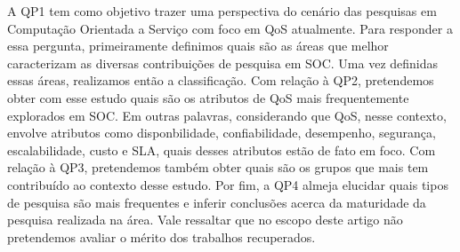 A QP1 tem como objetivo trazer uma perspectiva do cen\'{a}rio das pesquisas em Computa\c{c}\~{a}o Orientada a Servi\c{c}o com foco em QoS atualmente. Para responder a essa pergunta, primeiramente definimos quais s\~{a}o as \'{a}reas que melhor caracterizam as diversas contribui\c{c}\~{o}es de pesquisa em SOC. Uma vez definidas essas \'{a}reas, realizamos ent\~{a}o a classifica\c{c}\~{a}o. Com rela\c{c}\~{a}o \`{a} QP2, pretendemos obter com esse estudo quais s\~{a}o os atributos de QoS mais frequentemente explorados em SOC. Em outras palavras, considerando que QoS, nesse contexto, envolve atributos como disponbilidade, confiabilidade, desempenho, seguran\c{c}a, escalabilidade, custo e SLA, quais desses atributos est\~{a}o de fato em foco. Com rela\c{c}\~{a}o \`{a} QP3, pretendemos tamb\'{e}m obter quais s\~{a}o os grupos que mais tem contribu\'{i}do ao contexto desse estudo. Por fim, a QP4 almeja elucidar quais tipos de pesquisa s\~{a}o mais frequentes e inferir conclusões acerca da maturidade da pesquisa realizada na \'{a}rea. Vale ressaltar que no escopo deste artigo n\~{a}o pretendemos avaliar o m\'{e}rito dos trabalhos recuperados.


